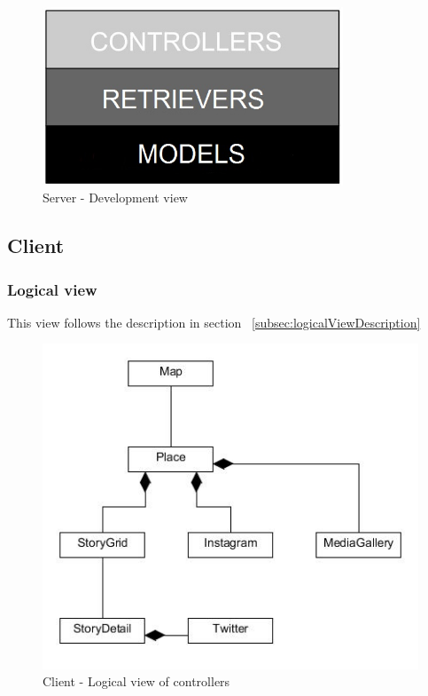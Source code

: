 \documentclass[11pt]{book}
\begin{document}
\begin{figure}[H]
      \centering
      \includegraphics[width=0.8\textwidth]{Figures/Architecture/serverDevelopment.jpg}
      \caption{Server - Development view}
      \label{fig:arch_server_development}
\end{figure}

\subsection{Client}

\subsubsection{Logical view}
This view follows the description in section ~\ref{subsec:logicalViewDescription}

\begin{figure}[H]
      \centering
      \includegraphics[width=1.0\textwidth]{Figures/Architecture/clientLogicalController.jpg}
      \caption{Client - Logical view of controllers}
      \label{fig:arch_client_logical_controllers}
\end{figure}
\end{document}
